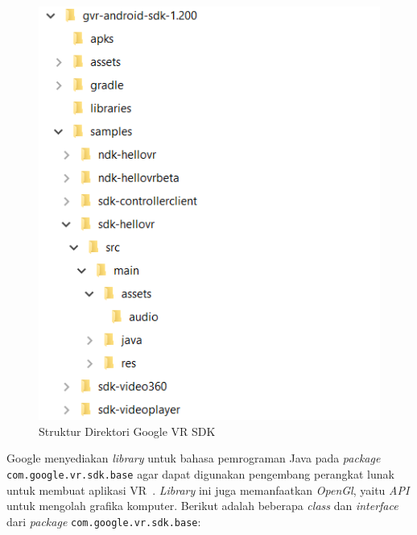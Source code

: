 \begin{figure}[h]
	\centering
		\includegraphics[scale=1.0]{Gambar/gvr_dir.png}
	\caption{Struktur Direktori Google VR SDK}
	\label{fig:gvr-dir}
\end{figure}

Google menyediakan \textit{library} untuk bahasa pemrograman Java pada \textit{package} \texttt{com.google.vr.sdk.base} agar dapat digunakan pengembang perangkat lunak untuk membuat aplikasi VR~\cite{google-vr-sdk}. \textit{Library} ini juga memanfaatkan \textit{OpenGl}, yaitu \textit{API} untuk mengolah grafika komputer. Berikut adalah beberapa \textit{class} dan \textit{interface} dari \textit{package} \texttt{com.google.vr.sdk.base}:

